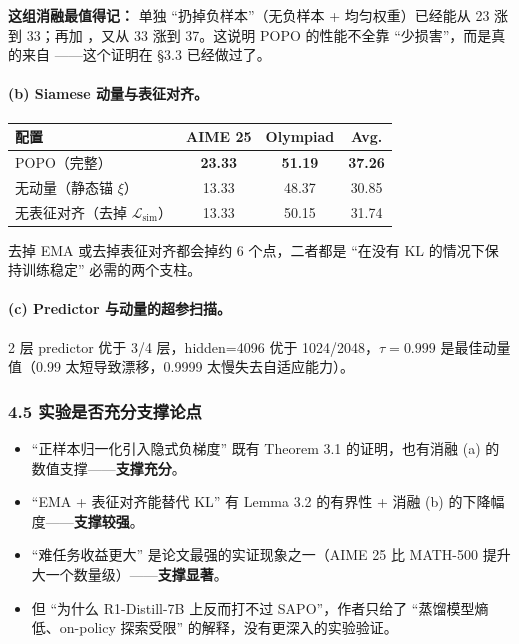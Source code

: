 \begin{warnbox}
\textbf{这组消融最值得记：} 单独 ``扔掉负样本''（无负样本 + 均匀权重）已经能从 23 涨到 33；再加 ，又从 33 涨到 37。这说明 POPO 的性能不全靠 ``少损害''，而是真的来自 ——这个证明在 §3.3 已经做过了。
\end{warnbox}

\paragraph{(b) Siamese 动量与表征对齐。}

\begin{center}
\begin{tabular}{lccc}
\toprule
\textbf{配置} & \textbf{AIME 25} & \textbf{Olympiad} & \textbf{Avg.}\\
\midrule
POPO（完整）            & \textbf{23.33} & \textbf{51.19} & \textbf{37.26}\\
无动量（静态锚 $\xi$）   & 13.33 & 48.37 & 30.85\\
无表征对齐（去掉 $\mathcal{L}_{\text{sim}}$） & 13.33 & 50.15 & 31.74\\
\bottomrule
\end{tabular}
\end{center}

去掉 EMA 或去掉表征对齐都会掉约 6 个点，二者都是 ``在没有 KL 的情况下保持训练稳定'' 必需的两个支柱。

\paragraph{(c) Predictor 与动量的超参扫描。}
2 层 predictor 优于 3/4 层，hidden=4096 优于 1024/2048，$\tau=0.999$ 是最佳动量值（0.99 太短导致漂移，0.9999 太慢失去自适应能力）。

\subsubsection{4.5 实验是否充分支撑论点}

\begin{itemize}[leftmargin=1.5em]
  \item ``正样本归一化引入隐式负梯度'' 既有 Theorem 3.1 的证明，也有消融 (a) 的数值支撑——\textbf{支撑充分}。
  \item ``EMA + 表征对齐能替代 KL'' 有 Lemma 3.2 的有界性 + 消融 (b) 的下降幅度——\textbf{支撑较强}。
  \item ``难任务收益更大'' 是论文最强的实证现象之一（AIME 25 比 MATH-500 提升大一个数量级）——\textbf{支撑显著}。
  \item 但 ``为什么 R1-Distill-7B 上反而打不过 SAPO''，作者只给了 ``蒸馏模型熵低、on-policy 探索受限'' 的解释，没有更深入的实验验证。
\end{itemize}

